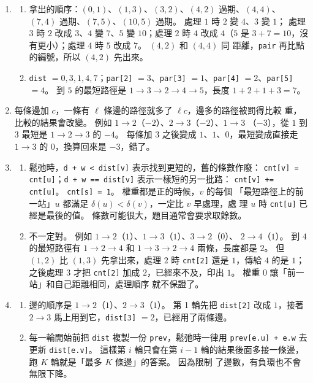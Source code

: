 \begin{enumerate}
\item
\begin{enumerate}
\item 拿出的順序：$(0, 1)$、$(1, 3)$、$(3, 2)$、$(4, 2)$ 過期、$(4, 4)$、
$(7, 4)$ 過期、$(7, 5)$、$(10, 5)$ 過期。 處理 $1$ 時 $2$ 變 $4$、$3$ 變 $1$；
處理 $3$ 時 $2$ 改成 $3$、$4$ 變 $7$、$5$ 變 $10$；處理 $2$ 時 $4$ 改成 $4$（$5$
是 $3 + 7 = 10$，沒有更小）；處理 $4$ 時 $5$ 改成 $7$。 $(4, 2)$ 和 $(4, 4)$ 同
距離，\texttt{pair} 再比點的編號，所以 $(4, 2)$ 先出來。
\item \texttt{dist} $= 0, 3, 1, 4, 7$；\texttt{par[2]} $= 3$、\texttt{par[3]}
$= 1$、\texttt{par[4]} $= 2$、\texttt{par[5]} $= 4$。 到 $5$ 的最短路徑是
$1 \to 3 \to 2 \to 4 \to 5$，長度 $1 + 2 + 1 + 3 = 7$。
\end{enumerate}

\item 每條邊加 $c$，一條有 $\ell$ 條邊的路徑就多了 $\ell c$，邊多的路徑被罰得比較
重，比較的結果會改變。 例如 $1 \to 2$（$-2$）、$2 \to 3$（$-2$）、$1 \to 3$
（$-3$），從 $1$ 到 $3$ 最短是 $1 \to 2 \to 3$ 的 $-4$。 每條加 $3$ 之後變成
$1$、$1$、$0$，最短變成直接走 $1 \to 3$ 的 $0$，換算回來是 $-3$，錯了。

\item
\begin{enumerate}
\item 鬆弛時，\texttt{d + w < dist[v]} 表示找到更短的，舊的條數作廢：
\texttt{cnt[v] = cnt[u]}；\texttt{d + w == dist[v]} 表示一樣短的另一批路：
\texttt{cnt[v] += cnt[u]}。 \texttt{cnt[s] = 1}。 權重都是正的時候，$v$ 的每個
「最短路徑上的前一站」$u$ 都滿足 $\delta(u) < \delta(v)$，一定比 $v$ 早處理，處
理 $u$ 時 \texttt{cnt[u]} 已經是最後的值。 條數可能很大，題目通常會要求取餘數。
\item 不一定對。 例如 $1 \to 2$（$1$）、$1 \to 3$（$1$）、$3 \to 2$（$0$）、
$2 \to 4$（$1$）。 到 $4$ 的最短路徑有 $1 \to 2 \to 4$ 和 $1 \to 3 \to 2 \to 4$
兩條，長度都是 $2$。 但 $(1, 2)$ 比 $(1, 3)$ 先拿出來，處理 $2$ 時
\texttt{cnt[2]} 還是 $1$，傳給 $4$ 的是 $1$；之後處理 $3$ 才把 \texttt{cnt[2]}
加成 $2$，已經來不及，印出 $1$。 權重 $0$ 讓「前一站」和自己距離相同，處理順序
就不保證了。
\end{enumerate}

\item
\begin{enumerate}
\item 邊的順序是 $1 \to 2$（$1$）、$2 \to 3$（$1$）。 第 1 輪先把 \texttt{dist[2]}
改成 $1$，接著 $2 \to 3$ 馬上用到它，\texttt{dist[3]} $= 2$，已經用了兩條邊。
\item 每一輪開始前把 \texttt{dist} 複製一份 \texttt{prev}，鬆弛時一律用
\texttt{prev[e.u] + e.w} 去更新 \texttt{dist[e.v]}。 這樣第 $i$ 輪只會在第
$i - 1$ 輪的結果後面多接一條邊，跑 $K$ 輪就是「最多 $K$ 條邊」的答案。 因為限制
了邊數，有負環也不會無限下降。
\end{enumerate}


\end{enumerate}
